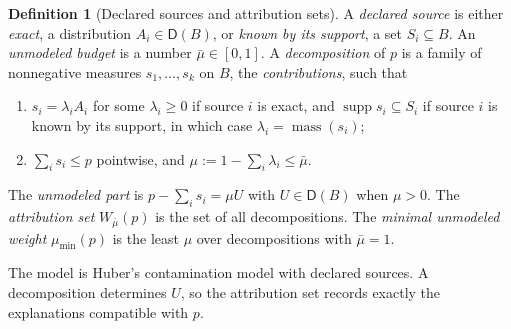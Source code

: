 \documentclass[11pt]{article}
\theoremstyle{definition}
\newtheorem{definition}[theorem]{Definition}
\theoremstyle{remark}
\newcommand{\D}{\mathsf{D}}
\newcommand{\supp}{\operatorname{supp}}
\newcommand{\mass}{\operatorname{mass}}
\begin{document}
\begin{definition}[Declared sources and attribution sets]\label{def:attset}
A \emph{declared source} is either \emph{exact}, a distribution $A_i\in\D(B)$, or \emph{known by its
support}, a set $S_i\subseteq B$. An \emph{unmodeled budget} is a number $\bar\mu\in[0,1]$. A
\emph{decomposition} of $p$ is a family of nonnegative measures $s_1,\dots,s_k$ on $B$, the
\emph{contributions}, such that
\begin{enumerate}[label=(\alph*)]
\item $s_i=\lambda_iA_i$ for some $\lambda_i\ge0$ if source $i$ is exact, and $\supp s_i\subseteq S_i$
  if source $i$ is known by its support, in which case $\lambda_i=\mass(s_i)$;
\item $\sum_is_i\le p$ pointwise, and $\mu:=1-\sum_i\lambda_i\le\bar\mu$.
\end{enumerate}
The \emph{unmodeled part} is $p-\sum_is_i=\mu U$ with $U\in\D(B)$ when $\mu>0$. The \emph{attribution
set} $W_{\bar\mu}(p)$ is the set of all decompositions. The \emph{minimal unmodeled weight}
$\mu_{\min}(p)$ is the least $\mu$ over decompositions with $\bar\mu=1$.
\end{definition}

The model is Huber's contamination model \cite{Huber1964} with declared sources. A decomposition
determines $U$, so the attribution set records exactly the explanations compatible with $p$.
\end{document}
